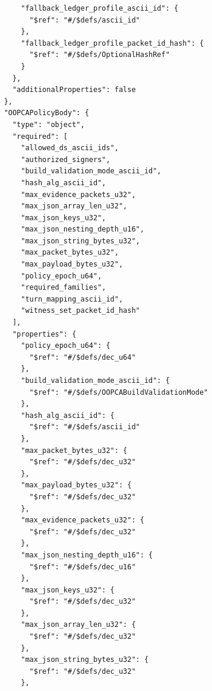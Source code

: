 \documentclass[11pt]{article}
\begin{document}
\begin{lstlisting}
        "fallback_ledger_profile_ascii_id": {
          "$ref": "#/$defs/ascii_id"
        },
        "fallback_ledger_profile_packet_id_hash": {
          "$ref": "#/$defs/OptionalHashRef"
        }
      },
      "additionalProperties": false
    },
    "OOPCAPolicyBody": {
      "type": "object",
      "required": [
        "allowed_ds_ascii_ids",
        "authorized_signers",
        "build_validation_mode_ascii_id",
        "hash_alg_ascii_id",
        "max_evidence_packets_u32",
        "max_json_array_len_u32",
        "max_json_keys_u32",
        "max_json_nesting_depth_u16",
        "max_json_string_bytes_u32",
        "max_packet_bytes_u32",
        "max_payload_bytes_u32",
        "policy_epoch_u64",
        "required_families",
        "turn_mapping_ascii_id",
        "witness_set_packet_id_hash"
      ],
      "properties": {
        "policy_epoch_u64": {
          "$ref": "#/$defs/dec_u64"
        },
        "build_validation_mode_ascii_id": {
          "$ref": "#/$defs/OOPCABuildValidationMode"
        },
        "hash_alg_ascii_id": {
          "$ref": "#/$defs/ascii_id"
        },
        "max_packet_bytes_u32": {
          "$ref": "#/$defs/dec_u32"
        },
        "max_payload_bytes_u32": {
          "$ref": "#/$defs/dec_u32"
        },
        "max_evidence_packets_u32": {
          "$ref": "#/$defs/dec_u32"
        },
        "max_json_nesting_depth_u16": {
          "$ref": "#/$defs/dec_u16"
        },
        "max_json_keys_u32": {
          "$ref": "#/$defs/dec_u32"
        },
        "max_json_array_len_u32": {
          "$ref": "#/$defs/dec_u32"
        },
        "max_json_string_bytes_u32": {
          "$ref": "#/$defs/dec_u32"
        },


\end{lstlisting}
\end{document}
